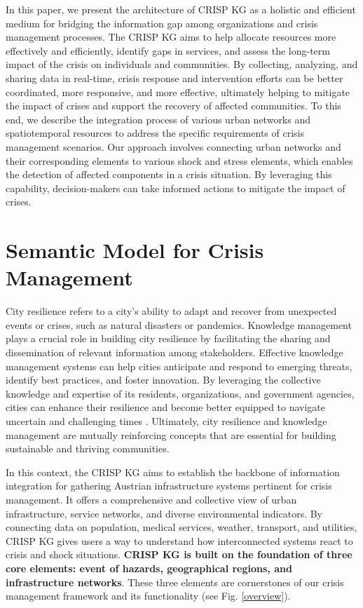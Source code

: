 \documentclass[
]{ceurart}
\begin{document}
In this paper, we present the architecture of CRISP KG as a holistic and efficient medium for bridging the information gap among organizations and crisis management processes. The CRISP KG aims to help allocate resources more effectively and efficiently, identify gaps in services, and assess the long-term impact of the crisis on individuals and communities. By collecting, analyzing, and sharing data in real-time, crisis response and intervention efforts can be better coordinated, more responsive, and more effective, ultimately helping to mitigate the impact of crises and support the recovery of affected communities. To this end, we describe the integration process of various urban networks and spatiotemporal resources to address the specific requirements of crisis management scenarios. Our approach involves connecting urban networks and their corresponding elements to various shock and stress elements, which enables the detection of affected components in a crisis situation. By leveraging this capability, decision-makers can take informed actions to mitigate the impact of crises.

\section{Semantic Model for Crisis Management}

City resilience refers to a city's ability to adapt and recover from unexpected events or crises, such as natural disasters or pandemics. Knowledge management plays a crucial role in building city resilience by facilitating the sharing and dissemination of relevant information among stakeholders. Effective knowledge management systems can help cities anticipate and respond to emerging threats, identify best practices, and foster innovation. By leveraging the collective knowledge and expertise of its residents, organizations, and government agencies, cities can enhance their resilience and become better equipped to navigate uncertain and challenging times \cite{desouza2013designing,ribeiro2019urban}. Ultimately, city resilience and knowledge management are mutually reinforcing concepts that are essential for building sustainable and thriving communities.

In this context, the CRISP KG aims to establish the backbone of information integration for gathering Austrian infrastructure systems pertinent for crisis management. It offers a comprehensive and collective view of urban infrastructure, service networks, and diverse environmental indicators. By connecting data on population, medical services, weather, transport, and utilities, CRISP KG gives users a way to understand how interconnected systems react to crisis and shock situations. \textbf{CRISP KG is built on the foundation of three core elements: event of hazards, geographical regions, and infrastructure networks}. These three elements are cornerstones of our crisis management framework and its functionality (see Fig. \ref{overview}). 
\end{document}

